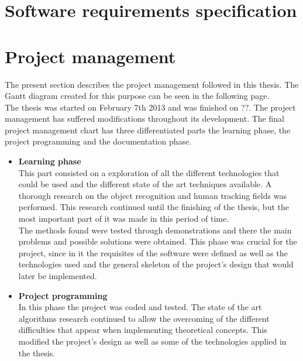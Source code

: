 \begin{appendices}
\chapter{Software requirements specification}
	


\chapter{Project management}
 The present section describes the project management followed in this thesis. The Gantt diagram created for this purpose can be seen in the following page.
 \\

 The thesis was started on February 7th 2013 and was finished on ??.  
 The project management has suffered modifications throughout its development.  The final project management chart has three differentiated parts the learning phase, the project programming and the documentation phase. 
 \begin {itemize}
 	\item{\textbf{Learning phase}} \\
 	This part consisted on a exploration of all the different technologies that could be used and the different state of the art techniques available. A thorough research on the object recognition and human tracking fields was performed. This research continued until the finishing of the thesis, but the most important part of it was made in this period of time. 
 	\\

 	The methods found were tested through demonstrations and there the main problems and possible solutions were obtained. This phase was crucial for the project, since in it the requisites of the software were defined as well as the technologies used and the general skeleton of the project's design that would later be implemented. 
 	\\

 	\item{\textbf{Project programming}}\\
 	In this phase the project was coded and tested. The state of the art algorithms research continued to allow the overcoming of the different difficulties that appear when implementing theoretical concepts. This modified the project's design as well as some of the technologies applied in the thesis. 


\end{itemize}
\end{appendices}
